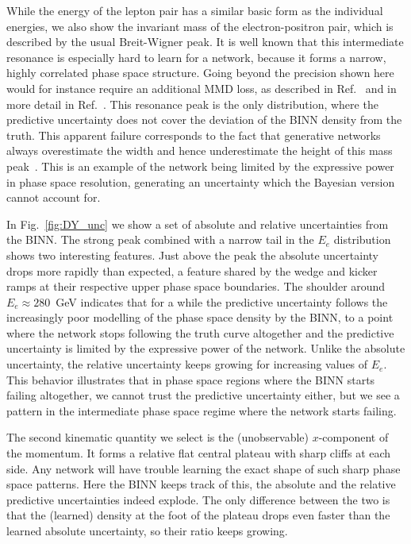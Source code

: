 While the energy of the lepton pair has a similar basic form as the
individual energies, we also show the invariant mass of the
electron-positron pair, which is described by the usual Breit-Wigner
peak. It is well known that this intermediate resonance is especially
hard to learn for a network, because it forms a narrow, highly
correlated phase space structure. Going beyond the precision shown
here would for instance require an additional MMD loss, as described
in Ref.~\cite{gan_phasespace} and in more detail in Ref.~\cite{fcgan}.
This resonance peak is the only distribution, where the predictive
uncertainty does not cover the deviation of the BINN density from the
truth. This apparent failure corresponds to the fact that generative
networks always overestimate the width and hence underestimate the
height of this mass peak~\cite{gan_phasespace}.  This is an example of
the network being limited by the expressive power in phase space
resolution, generating an uncertainty which the Bayesian version
cannot account for.

In Fig.~\ref{fig:DY_unc} we show a set of absolute and relative
uncertainties from the BINN. The strong peak combined with a narrow
tail in the $E_e$ distribution shows two interesting features. Just
above the peak the absolute uncertainty drops more rapidly than
expected, a feature shared by the wedge and kicker ramps at their
respective upper phase space boundaries. The shoulder around $E_e
\approx 280$~GeV indicates that for a while the predictive uncertainty
follows the increasingly poor modelling of the phase space density by
the BINN, to a point where the network stops following the truth curve
altogether and the predictive uncertainty is limited by the expressive
power of the network.  Unlike the absolute uncertainty, the relative
uncertainty keeps growing for increasing values of $E_e$.  This
behavior illustrates that in phase space regions where the BINN starts
failing altogether, we cannot trust the predictive uncertainty either,
but we see a pattern in the intermediate phase space regime where the
network starts failing.

The second kinematic quantity we select is the (unobservable)
$x$-component of the momentum. It forms a relative flat central
plateau with sharp cliffs at each side. Any network will have trouble
learning the exact shape of such sharp phase space patterns. Here the
BINN keeps track of this, the absolute and the relative predictive
uncertainties indeed explode. The only difference between the two is
that the (learned) density at the foot of the plateau drops even
faster than the learned absolute uncertainty, so their ratio keeps
growing.

